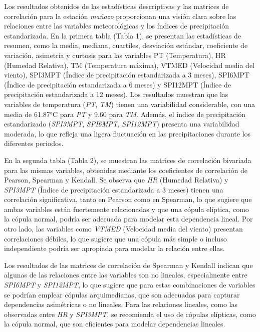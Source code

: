 \begin{figure}[htbp]
\end{figure}



Los resultados obtenidos de las estadísticas descriptivas y las matrices de correlación para la estación \textit{mañazo} proporcionan una visión clara sobre las relaciones entre las variables meteorológicas y los índices de precipitación estandarizada. En la primera tabla (Tabla 1), se presentan las estadísticas de resumen, como la media, mediana, cuartiles, desviación estándar, coeficiente de variación, asimetría y curtosis para las variables PT (Temperatura), HR (Humedad Relativa), TM (Temperatura máxima), VTMED (Velocidad media del viento), SPI3MPT (Índice de precipitación estandarizada a 3 meses), SPI6MPT (Índice de precipitación estandarizada a 6 meses) y SPI12MPT (Índice de precipitación estandarizada a 12 meses). Los resultados muestran que las variables de temperatura (\textit{PT}, \textit{TM}) tienen una variabilidad considerable, con una media de 61.87°C para \textit{PT} y 9.60 para \textit{TM}. Además, el índice de precipitación estandarizado (\textit{SPI3MPT}, \textit{SPI6MPT}, \textit{SPI12MPT}) presenta una variabilidad moderada, lo que refleja una ligera fluctuación en las precipitaciones durante los diferentes periodos.

En la segunda tabla (Tabla 2), se muestran las matrices de correlación bivariada para las mismas variables, obtenidas mediante los coeficientes de correlación de Pearson, Spearman y Kendall. Se observa que \textit{HR} (Humedad Relativa) y \textit{SPI3MPT} (Índice de precipitación estandarizada a 3 meses) tienen una correlación significativa, tanto en Pearson como en Spearman, lo que sugiere que ambas variables están fuertemente relacionadas y que una cópula elíptica, como la cópula normal, podría ser adecuada para modelar esta dependencia lineal. Por otro lado, las variables como \textit{VTMED} (Velocidad media del viento) presentan correlaciones débiles, lo que sugiere que una cópula más simple o incluso independiente podría ser apropiada para modelar la relación entre ellas.

Los resultados de las matrices de correlación de Spearman y Kendall indican que algunas de las relaciones entre las variables son no lineales, especialmente entre \textit{SPI6MPT} y \textit{SPI12MPT}, lo que sugiere que para estas combinaciones de variables se podrían emplear cópulas arquimedianas, que son adecuadas para capturar dependencias asimétricas o no lineales. Para las relaciones lineales, como las observadas entre \textit{HR} y \textit{SPI3MPT}, se recomienda el uso de cópulas elípticas, como la cópula normal, que son eficientes para modelar dependencias lineales.

